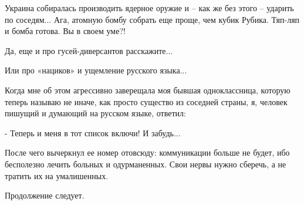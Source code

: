 Украина собиралась производить ядерное оружие и – как же без этого – ударить по
соседям... Ага, атомную бомбу собрать еще проще, чем кубик Рубика. Тяп-ляп и
бомба готова. Вы в своем уме?!

Да, еще и про гусей-диверсантов расскажите...

Или про «нациков» и ущемление русского языка...

Когда мне об этом агрессивно заверещала моя бывшая одноклассница, которую
теперь называю не иначе, как просто существо из соседней страны, я, человек
пишущий и думающий на русском языке, ответил:

- Теперь и меня в тот список включи! И забудь...

После чего вычеркнул ее номер отовсюду: коммуникации больше не будет, ибо
бесполезно лечить больных и одурманенных. Свои нервы нужно сберечь, а не
тратить их на умалишенных.

Продолжение следует.
